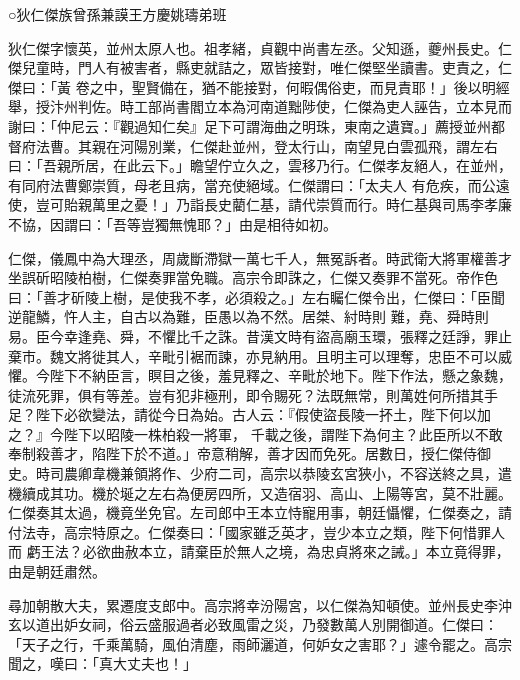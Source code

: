 
\begin{pinyinscope}

 ○狄仁傑族曾孫兼謨王方慶姚璹弟班



 狄仁傑字懷英，並州太原人也。祖孝緒，貞觀中尚書左丞。父知遜，夔州長史。仁傑兒童時，門人有被害者，縣吏就詰之，眾皆接對，唯仁傑堅坐讀書。吏責之，仁傑曰：「黃
 卷之中，聖賢備在，猶不能接對，何暇偶俗吏，而見責耶！」後以明經舉，授汴州判佐。時工部尚書閻立本為河南道黜陟使，仁傑為吏人誣告，立本見而謝曰：「仲尼云：『觀過知仁矣』足下可謂海曲之明珠，東南之遺寶。」薦授並州都督府法曹。其親在河陽別業，仁傑赴並州，登太行山，南望見白雲孤飛，謂左右曰：「吾親所居，在此云下。」瞻望佇立久之，雲移乃行。仁傑孝友絕人，在並州，有同府法曹鄭崇質，母老且病，當充使絕域。仁傑謂曰：「太夫人
 有危疾，而公遠使，豈可貽親萬里之憂！」乃詣長史藺仁基，請代崇質而行。時仁基與司馬李孝廉不協，因謂曰：「吾等豈獨無愧耶？」由是相待如初。



 仁傑，儀鳳中為大理丞，周歲斷滯獄一萬七千人，無冤訴者。時武衛大將軍權善才坐誤斫昭陵柏樹，仁傑奏罪當免職。高宗令即誅之，仁傑又奏罪不當死。帝作色曰：「善才斫陵上樹，是使我不孝，必須殺之。」左右矚仁傑令出，仁傑曰：「臣聞逆龍鱗，忤人主，自古以為難，臣愚以為不然。居桀、紂時則
 難，堯、舜時則易。臣今幸逢堯、舜，不懼比千之誅。昔漢文時有盜高廟玉環，張釋之廷諍，罪止棄市。魏文將徙其人，辛毗引裾而諫，亦見納用。且明主可以理奪，忠臣不可以威懼。今陛下不納臣言，瞑目之後，羞見釋之、辛毗於地下。陛下作法，懸之象魏，徒流死罪，俱有等差。豈有犯非極刑，即令賜死？法既無常，則萬姓何所措其手足？陛下必欲變法，請從今日為始。古人云：『假使盜長陵一抔土，陛下何以加之？』今陛下以昭陵一株柏殺一將軍，
 千載之後，謂陛下為何主？此臣所以不敢奉制殺善才，陷陛下於不道。」帝意稍解，善才因而免死。居數日，授仁傑侍御史。時司農卿韋機兼領將作、少府二司，高宗以恭陵玄宮狹小，不容送終之具，遣機續成其功。機於埏之左右為便房四所，又造宿羽、高山、上陽等宮，莫不壯麗。仁傑奏其太過，機竟坐免官。左司郎中王本立恃寵用事，朝廷懾懼，仁傑奏之，請付法寺，高宗特原之。仁傑奏曰：「國家雖乏英才，豈少本立之類，陛下何惜罪人而
 虧王法？必欲曲赦本立，請棄臣於無人之境，為忠貞將來之誡。」本立竟得罪，由是朝廷肅然。



 尋加朝散大夫，累遷度支郎中。高宗將幸汾陽宮，以仁傑為知頓使。並州長史李沖玄以道出妒女祠，俗云盛服過者必致風雷之災，乃發數萬人別開御道。仁傑曰：「天子之行，千乘萬騎，風伯清塵，雨師灑道，何妒女之害耶？」遽令罷之。高宗聞之，嘆曰：「真大丈夫也！」




\end{pinyinscope}

